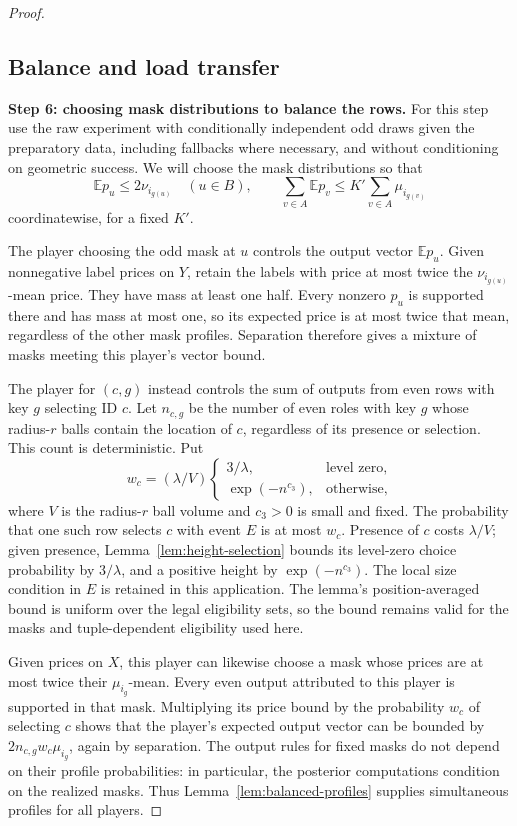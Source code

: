 \begin{proof}
\subsection{Balance and load transfer}
\label{sec:balance-and-load-transfer}

\noindent\textbf{Step 6: choosing mask distributions to balance the rows.}\quad
For this step use the raw experiment with conditionally independent odd
draws given the preparatory data, including fallbacks where necessary,
and without conditioning on geometric success. We will choose the mask
distributions so that
\[
 \mathbb E p_u\le2\nu_{i_{g(u)}}\quad(u\in B),\qquad
 \sum_{v\in A}\mathbb E p_v
       \le K'\sum_{v\in A}\mu_{i_{g(v)}}
\]
coordinatewise, for a fixed \(K'\).

The player choosing the odd mask at \(u\) controls the output vector
\(\mathbb E p_u\). Given nonnegative label prices on \(Y\), retain the
labels with price at most twice the \(\nu_{i_{g(u)}}\)-mean price.
They have mass at least one half. Every nonzero \(p_u\) is supported
there and has mass at most one, so its expected price is at most twice
that mean, regardless of the other mask profiles. Separation therefore
gives a mixture of masks meeting this player's vector bound.

The player for \((c,g)\) instead controls the sum of outputs from even
rows with key \(g\) selecting ID \(c\). Let \(n_{c,g}\) be the number
of even roles with key \(g\) whose radius-\(r\) balls contain the
location of \(c\), regardless of its presence or selection. This count
is deterministic. Put
\[
 w_c=(\lambda/V)
 \begin{cases}
 3/\lambda,&\text{level zero},\\
 \exp(-n^{c_3}),&\text{otherwise},
 \end{cases}
\]
where \(V\) is the radius-\(r\) ball volume and \(c_3>0\) is small and
fixed. The probability that one such row selects \(c\) with event \(E\)
is at most \(w_c\). Presence of \(c\) costs \(\lambda/V\); given
presence, Lemma~\ref{lem:height-selection} bounds its level-zero choice
probability by \(3/\lambda\), and a positive height by
\(\exp(-n^{c_3})\). The local size condition in \(E\) is retained in
this application. The lemma's position-averaged bound is uniform over
the legal eligibility sets, so the bound remains valid for the masks
and tuple-dependent eligibility used here.

Given prices on \(X\), this player can likewise choose a mask whose
prices are at most twice their \(\mu_{i_g}\)-mean. Every even output
attributed to this player is supported in that mask. Multiplying its
price bound by the probability \(w_c\) of selecting \(c\) shows that
the player's expected output vector can be bounded by
\(2n_{c,g}w_c\mu_{i_g}\), again by separation. The output rules for
fixed masks do not depend on their profile probabilities: in particular,
the posterior computations condition on the realized masks. Thus
Lemma~\ref{lem:balanced-profiles} supplies simultaneous profiles for
all players.


\end{proof}

